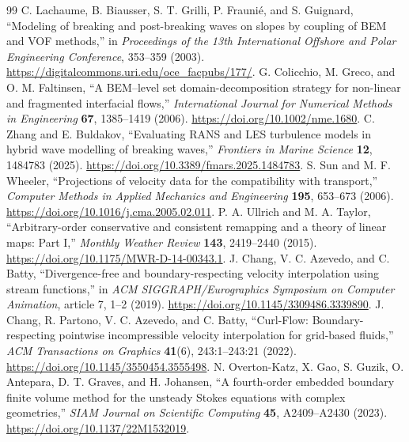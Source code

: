 \documentclass[10pt]{article}
\begin{document}
\begin{thebibliography}{99}
C. Lachaume, B. Biausser, S. T. Grilli, P. Frauni\'e, and S. Guignard,
``Modeling of breaking and post-breaking waves on slopes by coupling of BEM
and VOF methods,'' in \emph{Proceedings of the 13th International Offshore
and Polar Engineering Conference}, 353--359 (2003).
\url{https://digitalcommons.uri.edu/oce_facpubs/177/}.
G. Colicchio, M. Greco, and O. M. Faltinsen,
``A BEM--level set domain-decomposition strategy for non-linear and fragmented
interfacial flows,'' \emph{International Journal for Numerical Methods in
Engineering} \textbf{67}, 1385--1419 (2006).
\url{https://doi.org/10.1002/nme.1680}.
C. Zhang and E. Buldakov,
``Evaluating RANS and LES turbulence models in hybrid wave modelling of
breaking waves,'' \emph{Frontiers in Marine Science} \textbf{12}, 1484783 (2025).
\url{https://doi.org/10.3389/fmars.2025.1484783}.
S. Sun and M. F. Wheeler, ``Projections of velocity data for the compatibility
with transport,'' \emph{Computer Methods in Applied Mechanics and Engineering}
\textbf{195}, 653--673 (2006).
\url{https://doi.org/10.1016/j.cma.2005.02.011}.
P. A. Ullrich and M. A. Taylor,
``Arbitrary-order conservative and consistent remapping and a theory of linear
maps: Part I,'' \emph{Monthly Weather Review} \textbf{143}, 2419--2440 (2015).
\url{https://doi.org/10.1175/MWR-D-14-00343.1}.
J. Chang, V. C. Azevedo, and C. Batty,
``Divergence-free and boundary-respecting velocity interpolation using stream
functions,'' in \emph{ACM SIGGRAPH/Eurographics Symposium on Computer Animation},
article 7, 1--2 (2019).
\url{https://doi.org/10.1145/3309486.3339890}.
J. Chang, R. Partono, V. C. Azevedo, and C. Batty,
``Curl-Flow: Boundary-respecting pointwise incompressible velocity
interpolation for grid-based fluids,'' \emph{ACM Transactions on Graphics}
\textbf{41}(6), 243:1--243:21 (2022).
\url{https://doi.org/10.1145/3550454.3555498}.
N. Overton-Katz, X. Gao, S. Guzik, O. Antepara, D. T. Graves, and
H. Johansen, ``A fourth-order embedded boundary finite volume method
for the unsteady Stokes equations with complex geometries,''
\emph{SIAM Journal on Scientific Computing} \textbf{45}, A2409--A2430 (2023).
\url{https://doi.org/10.1137/22M1532019}.

\end{thebibliography}
\end{document}
